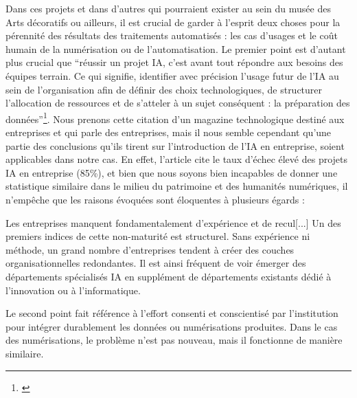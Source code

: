 Dans ces projets et dans d'autres qui pourraient exister au sein du musée des Arts décoratifs ou ailleurs, il est crucial de garder à l'esprit deux choses pour la pérennité des résultats des traitements automatisés : les cas d'usages et le coût humain de la numérisation ou de l'automatisation. Le premier point est d'autant plus crucial que \enquote{réussir un projet IA, c’est avant tout répondre aux besoins des équipes terrain. Ce qui signifie, identifier avec précision l’usage futur de l’IA au sein de l’organisation afin de définir des choix technologiques, de structurer l’allocation de ressources et de s’atteler à un sujet conséquent : la préparation des données}\footnote{\cite{it_social_ia_2025}}. Nous prenons cette citation d'un magazine technologique destiné aux entreprises et qui parle des entreprises, mais il nous semble cependant qu'une partie des conclusions qu'ils tirent sur l'introduction de l'IA en entreprise, soient applicables dans notre cas. En effet, l'article cite le taux d'échec élevé des projets IA en entreprise (85\%), et bien que nous soyons bien incapables de donner une statistique similaire dans le milieu du patrimoine et des humanités numériques, il n'empêche que les raisons évoquées sont éloquentes à plusieurs égards : 
\vspace{1em}

\noindent
\hspace*{1cm}
\begin{minipage}{\dimexpr\linewidth-2cm}
\fontsize{10}{12}\selectfont
Les entreprises manquent fondamentalement d’expérience et de recul[...] Un des premiers indices de cette non-maturité est structurel. Sans expérience ni méthode, un grand nombre d’entreprises tendent à créer des couches organisationnelles redondantes. Il est ainsi fréquent de voir émerger des départements spécialisés IA en supplément de départements existants dédié à l’innovation ou à l’informatique.\footnotemark{}
\end{minipage}

\vspace{1em}


Le second point fait référence à l'effort consenti et conscientisé par l'institution pour intégrer durablement les données ou numérisations produites. Dans le cas des numérisations, le problème n'est pas nouveau, mais il fonctionne de manière similaire. 


\vspace{1em}


